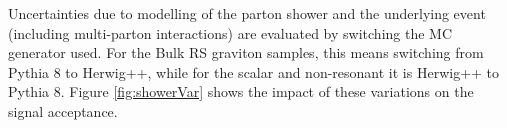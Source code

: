 
Uncertainties due to modelling of the parton shower and the underlying event (including multi-parton interactions) are evaluated by switching the MC generator used. For the Bulk RS graviton samples, this means switching from Pythia 8 to Herwig++, while for the scalar and non-resonant it is Herwig++ to Pythia 8. Figure \ref{fig:showerVar} shows the impact of these variations on the signal acceptance.

